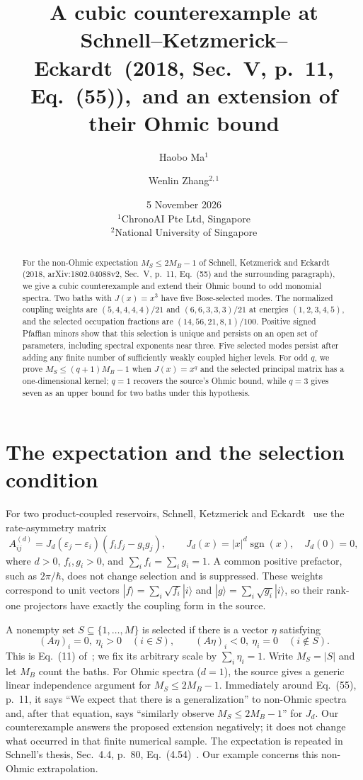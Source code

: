 \documentclass[11pt]{article}
\title{A cubic counterexample at Schnell--Ketzmerick--Eckardt\
(2018, Sec.\ V, p.\ 11, Eq.\ (55)),\
and an extension of their Ohmic bound}
\author{Haobo Ma$^{1}$ \and Wenlin Zhang$^{2,1}$}
\date{5 November 2026\\[3pt]
\small $^1$ChronoAI Pte Ltd, Singapore\\
\small $^2$National University of Singapore}
\newcommand{\sgn}{\operatorname{sgn}}
\begin{document}
\maketitle
\begin{abstract}
For the non-Ohmic expectation $M_S\leq 2M_B-1$ of
Schnell, Ketzmerick and Eckardt (2018, arXiv:1802.04088v2,
Sec.\ V, p.\ 11, Eq.\ (55) and the surrounding paragraph),
we give a cubic counterexample and extend their Ohmic bound
to odd monomial spectra.
Two baths with $J(x)=x^3$ have five Bose-selected modes.
The normalized coupling weights are $(5,4,4,4,4)/21$ and
$(6,6,3,3,3)/21$ at energies $(1,2,3,4,5)$, and the selected
occupation fractions are $(14,56,21,8,1)/100$.
Positive signed Pfaffian minors show that this selection is unique
and persists on an open set of parameters, including spectral
exponents near three. Five selected modes persist after adding
any finite number of sufficiently weakly coupled higher levels.
For odd $q$, we prove $M_S\leq(q+1)M_B-1$ when $J(x)=x^q$
and the selected principal matrix has a one-dimensional kernel;
$q=1$ recovers the source's Ohmic bound, while $q=3$ gives seven
as an upper bound for two baths under this hypothesis.
\end{abstract}

\section{The expectation and the selection condition}
For two product-coupled reservoirs, Schnell, Ketzmerick and
Eckardt~\cite[Sec.\ V, Eq.\ (50)]{ske} use the rate-asymmetry matrix
\begin{equation}\label{eq:matrix}
 A^{(d)}_{ij}=J_d(\varepsilon_j-\varepsilon_i)(f_i f_j-g_i g_j),
 \qquad J_d(x)=|x|^d\sgn(x),\quad J_d(0)=0,
\end{equation}
where $d>0$, $f_i,g_i>0$, and $\sum_i f_i=\sum_i g_i=1$.
A common positive prefactor, such as $2\pi/\hbar$, does not
change selection and is suppressed. These weights correspond to
unit vectors $|f\rangle=\sum_i\sqrt{f_i}|i\rangle$ and
$|g\rangle=\sum_i\sqrt{g_i}|i\rangle$, so their rank-one
projectors have exactly the coupling form in the source.

A nonempty set $S\subseteq\{1,\ldots,M\}$ is selected if there
is a vector $\eta$ satisfying
\begin{equation}\label{eq:selection}
 (A\eta)_i=0,\ \eta_i>0\quad(i\in S),\qquad
 (A\eta)_i<0,\ \eta_i=0\quad(i\notin S).
\end{equation}
This is Eq.\ (11) of~\cite{ske}; we fix its arbitrary scale by
$\sum_i\eta_i=1$. Write $M_S=|S|$ and let $M_B$ count the baths.
For Ohmic spectra ($d=1$), the source gives a generic linear
independence argument for $M_S\leq2M_B-1$. Immediately around
Eq.\ (55), p.\ 11, it says ``We expect that there is a generalization''
to non-Ohmic spectra and, after that equation, says ``similarly
observe $M_S\leq2M_B-1$'' for $J_d$.
Our counterexample answers the proposed extension negatively;
it does not change what occurred in that finite numerical sample.
The expectation is repeated in Schnell's thesis,
Sec.\ 4.4, p.\ 80, Eq.\ (4.54)~\cite{schnell}.
Our example concerns this non-Ohmic extrapolation.
\end{document}

